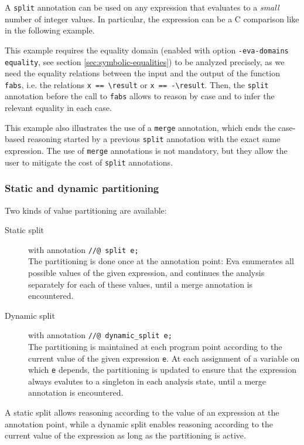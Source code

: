\documentclass{frama-c-book}
\begin{document}
A \lstinline|split| annotation can be used on any expression that evaluates to a
{\it small} number of integer values. In particular, the expression can be a C
comparison like in the following example.


This example requires the equality domain (enabled with option
\lstinline|-eva-domains equality|, see section \ref{sec:symbolic-equalities}) to
be analyzed precisely, as we need the equality relations between the input and
the output of the function \lstinline|fabs|, i.e. the relations
\lstinline|x == \result| or \lstinline|x == -\result|.
Then, the \lstinline|split| annotation before the call to \lstinline|fabs|
allows \Eva{} to reason by case and to infer the relevant equality in each case.

This example also illustrates the use of a \lstinline|merge| annotation, which
ends the case-based reasoning started by a previous \lstinline|split| annotation
with the exact same expression.
The use of \lstinline|merge| annotations is not mandatory, but they allow the
user to mitigate the cost of \lstinline|split| annotations.

\subsubsection{Static and dynamic partitioning}

Two kinds of value partitioning are available:
\begin{description}
\item[Static split] with annotation \lstinline|//@ split e;| \\
  The partitioning is done once at the annotation point: Eva enumerates all
  possible values of the given expression, and continues the analysis separately
  for each of these values, until a merge annotation is encountered.
\item[Dynamic split] with annotation \lstinline|//@ dynamic_split e;| \\
  The partitioning is maintained at each program point according to the current
  value of the given expression \lstinline|e|. At each assignment of a variable
  on which \lstinline|e| depends, the partitioning is updated to ensure that the
  expression always evalutes to a singleton in each analysis state, until a
  merge annotation is encountered.
\end{description}

A static split allows reasoning according to the value of an expression at the
annotation point, while a dynamic split enables reasoning according to the
current value of the expression as long as the partitioning is active.
\end{document}
